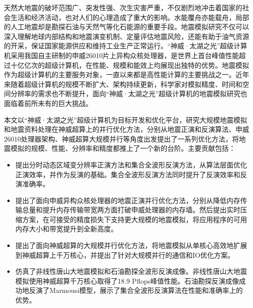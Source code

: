 \begin{cabstract}
天然大地震的破坏范围广、突发性强、次生灾害严重，不仅剧烈地冲击着国家的社会生活和经济活动，也对人们的心理造成了重大的影响。水能覆舟亦能载舟，局部的人工地震却是勘探石油与天然气等化石能源的重要手段。地震模拟研究不仅可以深入理解地球内部结构和地震演变机制、定量评估地震风险，还能有助于油气资源的开采，保证国家能源供应和维持工业生产正常运行。“神威·太湖之光”超级计算机采用我国自主研制的申威26010片上异构众核处理器，是世界上首台峰值性能超过十亿亿次的超级计算机，在性能、规模和能效上均展现出独特的优势。地震模拟作为超级计算机的主要服务对象，一直以来都是高性能计算的主要挑战之一。近年来随着超级计算机的规模不断扩大、架构持续更新，科学家对模拟精度、时间和空间分辨率的需求也不断提升，面向“神威·太湖之光”超级计算机的地震模拟研究也面临着前所未有的巨大挑战。


本文以“神威·太湖之光”超级计算机为目标开发和优化平台，研究大规模地震模拟和地震资料处理在神威超算上的并行优化方法，分别从地震正演和反演算法、申威26010处理器架构、神威超算大规模并行等角度出发提出了一系列优化方法，将地震模拟的规模、性能、分辨率和精度都推上了一个新的台阶。主要贡献包括：
  \begin{itemize}
    \item 提出分时动态区域变分辨率正演方法和集合全波形反演方法，从算法层面优化正演效率，并作为反演的基础。集合全波形反演方法同时提升了反演效率和反演准确率。
    
    \item 提出了面向申威异构众核处理器的地震正演并行优化方法，分别从降低内存传输总量和提升内存传输带宽两方面打破申威处理器的内存墙。然后提出实时压缩方案，在可接受的精度损失下支持更大规模的地震模拟，将应用程序的可用内存大小和带宽提升到全新高度。
    
    \item 提出了面向神威超算的大规模并行优化方法，将地震模拟从单核心高效地扩展到神威超算上千万核心，并提出了针对大规模并行的通信和IO优化方案。

    \item 仿真了非线性唐山大地震模拟和石油勘探全波形反演成像。非线性唐山大地震模拟使用神威超算千万核心取得了18.9 Pflops峰值性能。石油勘探反演成像成功地反演了Marmousi模型，展示了集合全波形反演算法在性能和准确率上的优势。
  \end{itemize}

\end{cabstract}


